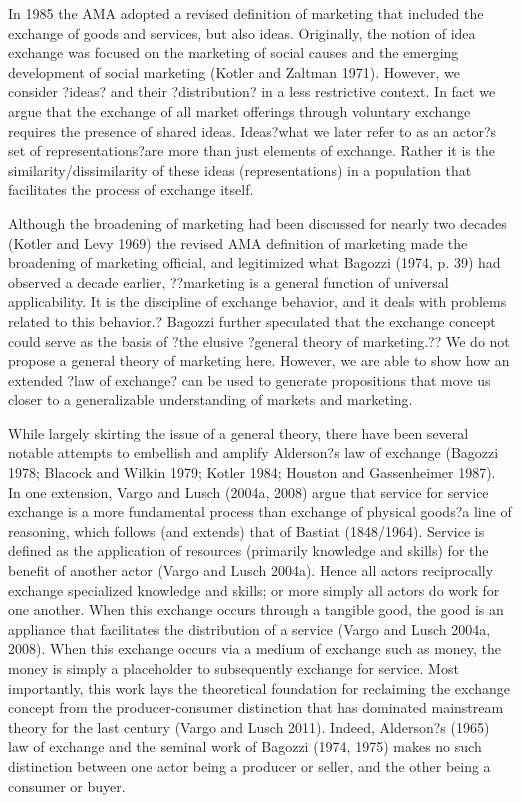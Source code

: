 In 1985 the AMA adopted a revised definition of marketing that included the exchange of goods and services, but also ideas. Originally, the notion of idea exchange was focused on the marketing of social causes and the emerging development of social marketing (Kotler and Zaltman 1971). However, we consider ?ideas? and their ?distribution? in a less restrictive context. In fact we argue that the exchange of all market offerings through voluntary exchange requires the presence of shared ideas. Ideas?what we later refer to as an actor?s set of representations?are more than just elements of exchange. Rather it is the similarity/dissimilarity of these ideas (representations) in a population that facilitates the process of exchange itself. 

Although the broadening of marketing had been discussed for nearly two decades (Kotler and Levy 1969) the revised AMA definition of marketing made the broadening of marketing official, and legitimized what Bagozzi (1974, p. 39) had observed a decade earlier,  ??marketing is a general function of universal applicability. It is the discipline of exchange behavior, and it deals with problems related to this behavior.? Bagozzi further speculated that the exchange concept could serve as the basis of ?the elusive ?general theory of marketing.?? We do not propose a general theory of marketing here. However, we are able to show how an extended ?law of exchange? can be used to generate propositions that move us closer to a generalizable understanding of markets and marketing. 

While largely skirting the issue of a general theory, there have been several notable attempts to embellish and amplify Alderson?s law of exchange (Bagozzi 1978; Blacock and Wilkin 1979; Kotler 1984; Houston and Gassenheimer 1987). In one extension, Vargo and Lusch (2004a, 2008) argue that service for service exchange is a more fundamental process than exchange of physical goods?a line of reasoning, which follows (and extends) that of Bastiat (1848/1964). Service is defined as the application of resources (primarily knowledge and skills) for the benefit of another actor (Vargo and Lusch 2004a). Hence all actors reciprocally exchange specialized knowledge and skills; or more simply all actors do work for one another. When this exchange occurs through a tangible good, the good is an appliance that facilitates the distribution of a service (Vargo and Lusch 2004a, 2008). When this exchange occurs via a medium of exchange such as money, the money is simply a placeholder to subsequently exchange for service. Most importantly, this work lays the theoretical foundation for reclaiming the exchange concept from the producer-consumer distinction that has dominated mainstream theory for the last century (Vargo and Lusch 2011). Indeed, Alderson?s (1965) law of exchange and the seminal work of Bagozzi (1974, 1975) makes no such distinction between one actor being a producer or seller, and the other being a consumer or buyer. 


